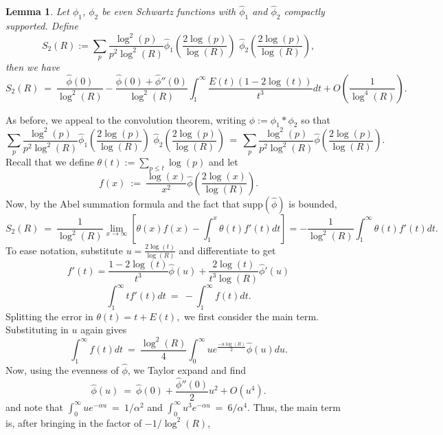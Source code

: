 \documentclass[11pt, reqno]{amsart}
\makeatletter
\renewenvironment{proof}[1][\proofname]{\par
  \vspace{-.7\topsep}%
  \pushQED{\qed}%
  \normalfont
  \topsep0pt \partopsep0pt %
  \trivlist
  \item[\hskip\labelsep
        \itshape
    #1\@addpunct{.}]\ignorespaces
}{%
  \popQED\endtrivlist\@endpefalse
  \addvspace{6pt plus 6pt} %
}
\newtheorem{lemma}[theorem]{Lemma}
\theoremstyle{definition}
\theoremstyle{remark}
\numberwithin{equation}{section}
\renewcommand{\hat}{\widehat}
\makeatother
\begin{document}
\begin{lemma}\label{lem:S_2(R)}
    Let $\phi_1$, $\phi_2$ be even Schwartz functions with $\widehat \phi_1$ and $\widehat \phi_2$ compactly supported. Define
$$S_2(R):=\sum_{p}\frac{\log^2(p)}{p^2\log^2(R)}\hat\phi_1\left(\frac{2\log(p)}{\log(R)}\right)\,\,\hat\phi_2\left(\frac{2\log(p)}{\log(R)}\right),$$
    then we have
\[
    S_2(R) \ = \ \frac{\hat\phi(0)}{\log^2(R)}-\frac{\hat \phi(0)+\hat\phi''(0)}{\log^2(R)}\int_1^\infty \frac{E(t)(1-2\log(t))}{t^3}dt+O\left(\frac{1}{\log^4(R)}\right).
\]
\end{lemma}
\begin{proof}
As before, we appeal to the convolution theorem, writing $\phi := \phi_1*\phi_2$ so that
\begin{equation}
\sum_{p}\frac{\log^2 (p)}{p^2\log^2(R)}\hat\phi_1\left(\frac{2\log(p)}{\log(R)}\right)\,\,\hat\phi_2\left(\frac{2\log(p)}{\log(R)}\right)\,=\,\sum_p \frac{\log^2(p)}{p^2\log^2(R)}\hat\phi\left(\frac{2\log(p)}{\log(R)}\right).
\end{equation}
Recall that we define $\theta(t):=\sum_{p\leq t} \log(p)$ and let
$$f(x) \ := \ \frac{\log(x)}{x^2}\hat\phi\left(\frac{2\log(x)}{\log(R)}\right).$$
Now, by the Abel summation formula and the fact that $\mathrm{supp}(\hat\phi)$ is bounded,
\begin{equation}
S_2(R) \ = \ \frac{1}{\log^2(R)}\lim_{x\to \infty}\left[ \theta(x) f(x)-\int_1^x \theta(t)f'(t)dt\right]=-\frac{1}{\log^2(R)}\int_1^\infty \theta(t) f'(t)dt.
\end{equation}
To ease notation, substitute $u=\frac{2\log(t)}{\log(R)}$ and differentiate to get
\begin{equation}
f'(t)=\frac{1-2\log(t)}{t^3}\hat\phi(u)+\frac{2\log(t)}{t^3\log(R)}\hat\phi'(u)
\end{equation}
\begin{equation}
\int_1^\infty t f'(t)dt \ = \ -\int_1^\infty f(t)dt.
\end{equation}
Splitting the error in $\theta(t)=t+E(t),$ we first consider the main term. Substituting in $u$ again gives
\begin{equation}
\int_1^\infty f(t)dt \ = \ \frac{\log ^2 (R)}{4}\int_0^\infty  u e^\frac{-u\log(R)}{2}\hat\phi(u)du.
\end{equation}
Now, using the evenness of $\hat\phi$, we Taylor expand and find
\begin{equation}
\hat\phi(u) \ = \ \hat\phi(0)+\frac{\hat\phi''(0)}{2}u^2+O(u^4).
\end{equation}
and note that $\int_0^\infty ue^{-\alpha u} \ = \ 1/\alpha^2$ and $\int_0^\infty u^3e^{-\alpha u} \ = \ 6/\alpha^4.$ Thus, the main term is, after bringing in the factor of $-1/\log^2(R)$,

\end{proof}
\end{document}
